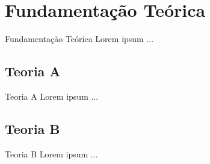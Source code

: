 \section{Fundamentação Teórica}
\label{s.background}

\begin{frame}{Fundamentação Teórica}
	Lorem ipsum ...
\end{frame}

\subsection{Teoria A}
\label{ss.theory_a}

\begin{frame}{Teoria A}
	Lorem ipsum ...
\end{frame}

\subsection{Teoria B}
\label{ss.theory_b}

\begin{frame}{Teoria B}
	Lorem ipsum ...
\end{frame}